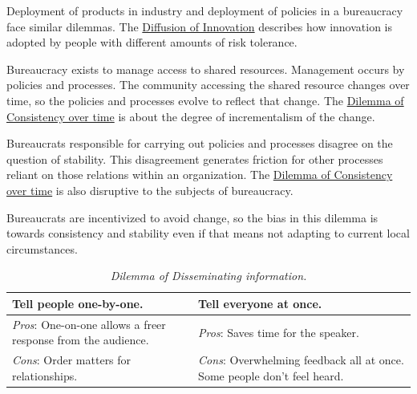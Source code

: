 Deployment of products in industry and deployment of policies in a bureaucracy face similar dilemmas. The \href{https://en.wikipedia.org/wiki/Diffusion_of_innovations}{Diffusion of Innovation} 
describes how innovation is adopted by people with different amounts of risk tolerance.

Bureaucracy exists to manage access to shared resources. Management occurs by policies and processes. The community accessing the shared resource changes over time, so the policies and processes evolve to reflect that change. The \hyperref[table:dilemma-personal-consistency-gradual-stepwise]{Dilemma of Consistency over time} is about the degree of incrementalism of the change.

Bureaucrats responsible for carrying out policies and processes disagree on the question of stability. This disagreement generates friction for other processes reliant on those relations within an organization.
The \hyperref[table:dilemma-personal-consistency-gradual-stepwise]{Dilemma of Consistency over time} is also disruptive to the subjects of bureaucracy. 

Bureaucrats are incentivized to avoid change, so the bias in this dilemma is towards consistency and stability even if that means not adapting to current local circumstances. 

\begin{center}
\begin{table}[H] %
\begin{tabular}{ | m{\dilemmatablewidth}| m{\dilemmatablewidth} | } 
  \hline
  \textbf{Tell people one-by-one.} & 
  \textbf{Tell everyone at once.} \\ 
  \hline
  \textit{Pros}: One-on-one allows a freer response from the audience. &
  \textit{Pros}: Saves time for the speaker. \\
  \hline
  \textit{Cons}: Order matters for relationships. & 
  \textit{Cons}: Overwhelming feedback all at once. Some people don't feel heard. \\  
  \hline
\end{tabular}
\caption{
\textit{Dilemma of Disseminating information.}
}
\label{table:dilemma-personal-disseminate-one-by-one}
\end{table}
\end{center}

